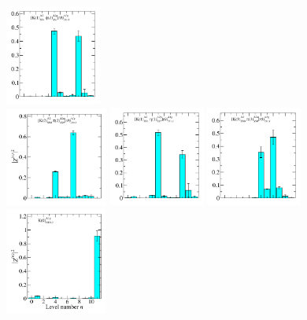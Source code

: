 \begin{figure}
  \includegraphics[width=0.28\textwidth]{figures/spectrum_a1g/with_tq/zfactors/zfactor_isodoublet_kaon_phi-A1g_1-P001-A2-SS_1-P00-1-A2p-SS_1.pdf}\\
  \includegraphics[width=0.3\textwidth]{figures/spectrum_a1g/with_tq/zfactors/zfactor_isodoublet_kaon_pion-A1g_1-P011-A2-SS_0-P0-1-1-A2m-SS_0.pdf}
  \includegraphics[width=0.28\textwidth]{figures/spectrum_a1g/with_tq/zfactors/zfactor_isodoublet_kaon_eta-A1g_1-P001-A2-SS_1-P00-1-A2p-SS_1.pdf}
  \includegraphics[width=0.28\textwidth]{figures/spectrum_a1g/with_tq/zfactors/zfactor_isodoublet_kaon_pion-A1g_1-P111-A2-SS_0-P-1-1-1-A2m-SS_0.pdf}\\
  \includegraphics[width=0.3\textwidth]{figures/spectrum_a1g/with_tq/zfactors/zfactor_kaon-P000-A1g_1-DDL_2.pdf}

\end{figure}
